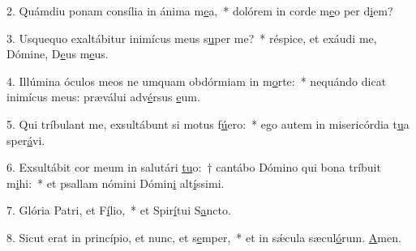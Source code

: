 2. Quámdiu ponam consília in ánima m\uline{e}a,~* dolórem in corde m\uline{e}o per d\uline{i}em?\par 
3. Usquequo exaltábitur inimícus meus s\uline{u}per me?~* réspice, et exáudi me, Dómine, D\uline{e}us m\uline{e}us.\par 
4. Illúmina óculos meos ne umquam obdórmiam in m\uline{o}rte:~* nequándo dicat inimícus meus: præválui adv\uline{é}rsus \uline{e}um.\par 
5. Qui tríbulant me, exsultábunt si motus f\uline{ú}ero:~* ego autem in misericórdia t\uline{u}a sper\uline{á}vi.\par 
6. Exsultábit cor meum in salutári \uline{tu}o:~† cantábo Dómino qui bona tríbuit m\uline{i}hi:~* et psallam nómini Dómin\uline{i} alt\uline{í}ssimi.\par 
7. Glória Patri, et F\uline{í}lio,~* et Spir\uline{í}tui S\uline{a}ncto.\par 
8. Sicut erat in princípio, et nunc, et s\uline{e}mper,~* et in sǽcula sæcul\uline{ó}rum. \uline{A}men.\par 
